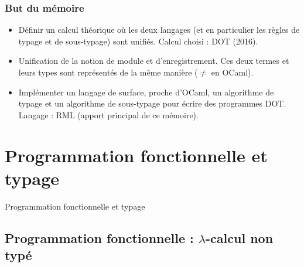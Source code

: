 \documentclass{beamer}
\begin{document}
\begin{frame}
  \inputminted{OCaml}{codes/intro_point2D_polymorphic.ml}
  \begin{center}
  \end{center}
\end{frame}

\begin{frame}
  \frametitle{But du mémoire}
  \begin{itemize}
  \item Définir un calcul théorique où les deux langages (et en particulier les
    règles de typage et de sous-typage) sont unifiés. Calcul choisi : DOT (2016).
  \item Unification de la notion de module et d'enregistrement. Ces deux termes
    et leurs types sont représentés de la même manière ($\neq$ en OCaml).
  \item Implémenter un langage de surface, proche d'OCaml, un algorithme de
    typage et un algorithme de sous-typage pour écrire des programmes DOT.
    Langage : RML (apport principal de ce mémoire).
  \end{itemize}
\end{frame}

\section{Programmation fonctionnelle et typage}

\begin{frame}
	\begin{center}
		\Huge{Programmation fonctionnelle et typage}
	\end{center}
\end{frame}

\subsection{Programmation fonctionnelle : $\lambda$-calcul non typé}
\end{document}
